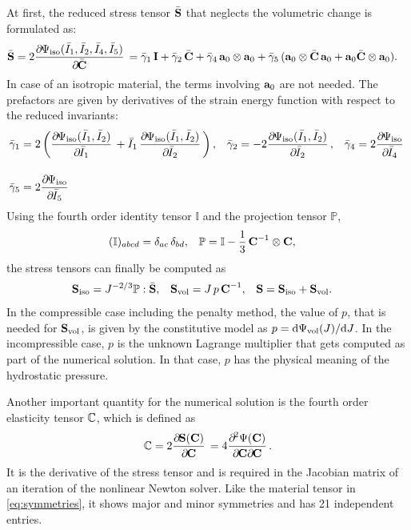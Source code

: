 At first, the reduced stress tensor $\bar{\textbf{S}}$ that neglects the volumetric change is formulated as:%
%
\begin{align*}
  \bar{\bfS} = 2\p{\Psi_\text{iso}(\bar{I}_1,\bar{I}_2,\bar{I}_4,\bar{I}_5)}{\bar{\bfC}} &= \bar{\gamma}_1\,\bfI + \bar{\gamma}_2\,\bar{\bfC}
  + \bar{\gamma}_4\, \bfa_0 \otimes \bfa_0 + \bar{\gamma}_5\,(\bfa_0 \otimes \bar{\bfC}\,\bfa_0 + \bfa_0\bar{\bfC}\otimes \bfa_0).
\end{align*}
In case of an isotropic material, the terms involving $\textbf{a}_0$ are not needed. The prefactors are given by derivatives of the strain energy function with respect to the reduced invariants:
%
\begin{align*}
  \bar{\gamma}_1 &= 2\left(\p{\Psi_\text{iso}(\bar{I}_1, \bar{I}_2)}{\bar{I}_1} + \bar{I}_1\,\p{\Psi_\text{iso}(\bar{I}_1, \bar{I}_2)}{\bar{I}_2}\right),
  &\bar{\gamma}_2 &= -2\p{\Psi_\text{iso}(\bar{I}_1, \bar{I}_2)}{\bar{I}_2},
  &\bar{\gamma}_4 &= 2\p{\Psi_\text{iso}}{\bar{I}_4}\\[4mm]
  \bar{\gamma}_5 &= 2\p{\Psi_\text{iso}}{\bar{I}_5}
\end{align*}
%
Using the fourth order identity tensor $\mathbb{I}$ and the projection tensor $\mathbb{P}$,%
\begin{align*}
  (\mathbb{I})_{abcd} &= \delta_{ac}\,\delta_{bd}, &
  \mathbb{P} &= \mathbb{I} - \displaystyle\frac{\displaystyle{1}}{\displaystyle{3}}\, \textbf{C}^{-1} \otimes \textbf{C},
\end{align*}
the stress tensors can finally be computed as
\begin{align*}
  \textbf{S}_\text{iso} &= J^{-2/3}\mathbb{P}:\bar{\textbf{S}}, &
  \textbf{S}_\text{vol} &= J\,p\,\textbf{C}^{-1}, &
  \textbf{S} &= \textbf{S}_\text{iso} + \textbf{S}_\text{vol}.
\end{align*}
In the compressible case including the penalty method, the value of $p$, that is needed for $\textbf{S}_\text{vol}$, is given by the constitutive model as $p = \d \Psi_\text{vol}(J)/\d J$. In the incompressible case, $p$ is the unknown Lagrange multiplier that gets computed as part of the numerical solution. In that case, $p$ has the physical meaning of the hydrostatic pressure.

Another important quantity for the numerical solution is the fourth order elasticity tensor $\mathbb{C}$, which is defined as
\begin{align*}
  \C = 2\p{\bfS(\bfC)}{\bfC} = 4\dfrac{\partial^2 \Psi(\bfC)}{\partial\bfC\partial\bfC}.
\end{align*}
It is the derivative of the stress tensor and is required in the Jacobian matrix of an iteration of the nonlinear Newton solver. Like the material tensor in \cref{eq:symmetries}, it shows major and minor symmetries and has 21 independent entries.

